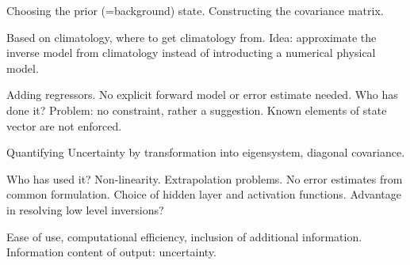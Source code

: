    \startsubsection[title={Constructing the Prior},reference=ch:construct_prior]

        Choosing the prior (=background) state. Constructing the covariance
        matrix.

    \stopsubsection

\stopsection


\startsection[title=Linear Regression]

    Based on climatology, where to get climatology from. Idea: approximate
    the inverse model from climatology instead of introducting a numerical
    physical model.

    Adding regressors. No explicit forward model or error estimate needed.
    Who has done it? Problem: no constraint, rather a suggestion. Known
    elements of state vector are not enforced.
    
    Quantifying Uncertainty by transformation into eigensystem, diagonal
    covariance.

\stopsection


\startsection[title=Neural Network Regression]

    Who has used it? Non-linearity. Extrapolation problems. No error estimates
    from common formulation. Choice of hidden layer and activation functions.
    Advantage in resolving low level inversions?

\stopsection


\startsection[title=Comparison of Techniques]

    Ease of use, computational efficiency, inclusion of additional information.
    Information content of output: uncertainty.

\stopsection

